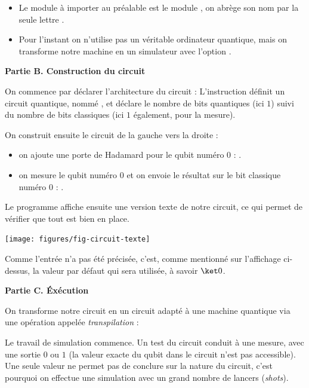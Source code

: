 \documentclass[11pt,class=report,crop=false]{standalone}
\begin{document}
\begin{itemize}
  \item Le module \Python{} à importer au préalable est le module \qiskit{}, on abrège son nom par la seule lettre .
  \item Pour l'instant on n'utilise pas un véritable ordinateur quantique, mais on transforme notre machine en un simulateur avec l'option .
\end{itemize}

\bigskip
\textbf{Partie B. Construction du circuit}

On commence par déclarer l'architecture du circuit :
L'instruction définit un circuit quantique, nommé , et déclare le nombre de bits quantiques (ici $1$) suivi du nombre de bits classiques (ici $1$ également, pour la mesure).

On construit ensuite le circuit de la gauche vers la droite :
\begin{itemize}
  \item on ajoute une porte  de Hadamard pour le qubit numéro $0$ : .
  \item on mesure le qubit numéro $0$ et on envoie le résultat sur le bit classique numéro $0$ : .
\end{itemize}

Le programme affiche ensuite une version texte de notre circuit, ce qui permet de vérifier que tout est bien en place. 
\begin{center}
\texttt{[image: figures/fig-circuit-texte]}
\end{center}
Comme l'entrée n'a pas été précisée, c'est, comme mentionné sur l'affichage ci-dessus, la valeur par défaut qui sera utilisée, à savoir $\ket0$.

\bigskip
\textbf{Partie C. \'Exécution}

On transforme notre circuit en un circuit adapté à une machine quantique via une opération appelée \emph{transpilation} :

Le travail de simulation commence. 
Un test du circuit conduit à une mesure, avec une sortie $0$ ou $1$  (la valeur exacte du qubit dans le circuit n'est pas accessible). Une seule valeur ne permet pas de conclure sur la nature du circuit, c'est pourquoi on effectue une simulation avec un grand nombre de lancers (\emph{shots}). 
\end{document}
